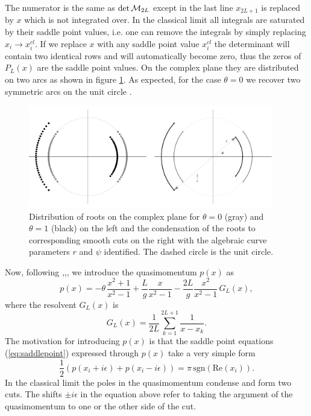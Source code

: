 \label{eq:PLrepr}
\eeq
The numerator is the same as $\det {\cal M}_{2L}$ except in the last line $x_{2L+1}$ is replaced by $x$ which is not integrated over. In the classical limit all integrals are saturated by their saddle point values, i.e. one can remove the integrals by simply replacing $x_i \rightarrow x_i^{cl}$. If we replace $x$ with any saddle point value $x_i^{cl}$ the determinant will contain two identical rows and will automatically become zero, thus the zeros of $P_L(x)$ are the saddle point values. On the complex plane they are distributed on two arcs as shown in figure \ref{fig:roots}. As expected, for the case $\theta=0$ we recover two symmetric arcs on the unit circle \cite{Gromov:2012eu}.
\begin{figure}[t]
	\centering
		\includegraphics[width=0.95\textwidth]{../graphics/roots_cuts}
	\caption{Distribution of roots on the complex plane for $\theta=0$ (gray) and $\theta=1$ (black) on the left and the condensation of the roots to corresponding smooth cuts on the right with the algebraic curve parameters $r$ and $\psi$ identified. The dashed circle is the unit circle.}
	\label{fig:roots}
\end{figure}


Now, following \cite{Gromov:2007aq},\cite{Beisert:2005bm},\cite{Gromov:2012eu}, we introduce the quasimomentum $p(x)$ as
\begin{equation}
	p(x) = -\theta \, \frac{x^2 + 1}{x^2 - 1} + \frac{L}{g} \frac{x}{x^2 - 1} - \frac{2L}{g} \frac{x^2}{x^2 - 1} \, G_L(x),
	\label{eq:quantum_quasimomentum}
\end{equation}
where the resolvent $G_L(x)$ is
\begin{equation}
	G_L(x) = \frac{1}{2L} \sum_{k=1}^{2L+1} \frac{1}{x-x_k}.
	\label{eq:resolvent}
\end{equation}
The motivation for introducing $p(x)$ is that  the saddle point equations (\ref{eq:saddlepoint}) expressed through $p(x)$ take a very simple form
\begin{equation}
	\frac{1}{2} \left( p(x_i + i \epsilon) + p(x_i - i \epsilon) \right) = \pi \, \mathrm{sgn}(\mathrm{Re}(x_i)).
	\label{eq:pepsilon}
\end{equation}
In the classical limit the poles in the quasimomentum condense and form two cuts. The shifts $\pm i\epsilon$ in the equation above refer to taking the argument of the quasimomentum to one or the other side of the cut.


